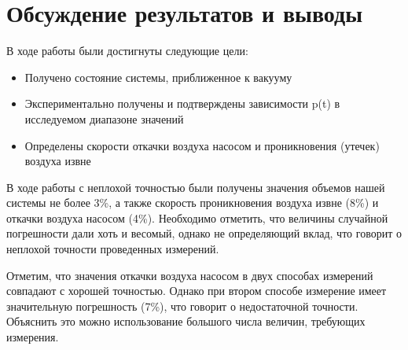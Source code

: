 \documentclass[12pt,a4paper]{article}
\begin{document}
\newpage

\section{Обсуждение результатов и выводы}

В ходе работы были достигнуты следующие цели:
\begin{itemize}
\item Получено состояние системы, приближенное к вакууму
\item Экспериментально получены и подтверждены зависимости p(t) в исследуемом диапазоне значений
\item Определены скорости откачки воздуха насосом и проникновения (утечек) воздуха извне
\end{itemize}

В ходе работы с неплохой точностью были получены значения объемов нашей системы не более 3\%, а также скорость проникновения воздуха извне (8\%) и откачки воздуха насосом (4\%). Необходимо отметить, что величины случайной погрешности дали хоть и весомый, однако не определяющий вклад, что говорит о неплохой точности проведенных измерений.

Отметим, что значения откачки воздуха насосом в двух способах измерений совпадают с хорошей точностью. Однако при втором способе измерение имеет значительную погрешность (7\%), что говорит о недостаточной точности. Объяснить это можно использование большого числа величин, требующих измерения.
\end{document}
